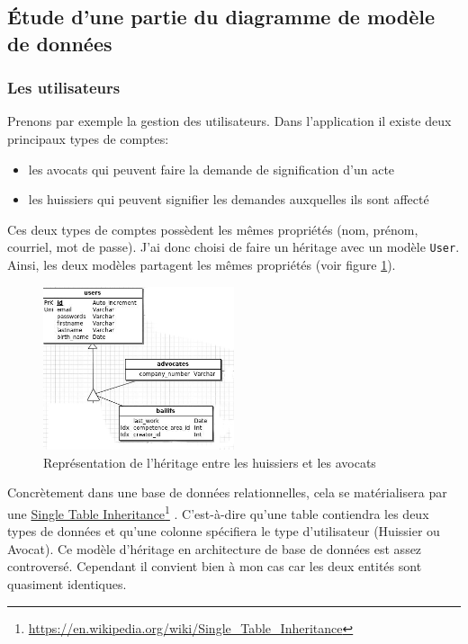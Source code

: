 \documentclass[]{report}
\newcommand\fnurl[2]{%
  \href{#1}{#2}\footnote{\url{#1}}%
}
\begin{document}
    \subsection{Étude d'une partie du diagramme de modèle de données}

      \subsubsection{Les utilisateurs}

        Prenons par exemple la gestion des utilisateurs. Dans l'application il existe deux principaux types de comptes:

        \begin{itemize}
          \item les avocats qui peuvent faire la demande de signification d'un acte
          \item les huissiers qui peuvent signifier les demandes auxquelles ils sont affecté
        \end{itemize}

        Ces deux types de comptes possèdent les mêmes propriétés (nom, prénom, courriel, mot de passe). J'ai donc choisi de faire un héritage avec un modèle \verb|User|. Ainsi, les deux modèles partagent les mêmes propriétés (voir figure \ref{fig:merise_users}).

        \begin{figure}[h!]
          \centering
          \includegraphics[width=0.5\textwidth]{img/merise_users.png}
          \caption{Représentation de l'héritage entre les huissiers et les avocats}
          \label{fig:merise_users}
        \end{figure}

        Concrètement dans une base de données relationnelles, cela se matérialisera par une \fnurl{https://en.wikipedia.org/wiki/Single_Table_Inheritance}{Single Table Inheritance}. C'est-à-dire qu'une table contiendra les deux types de données et qu'une colonne spécifiera le type d'utilisateur (Huissier ou Avocat). Ce modèle d'héritage en architecture de base de données est assez controversé. Cependant il convient bien à mon cas car les deux entités sont quasiment identiques.
\end{document}
